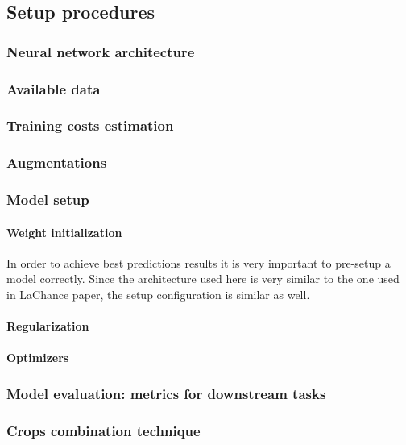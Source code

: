 \subsection{Setup procedures}
    \subsubsection{Neural network architecture}
        
    \subsubsection{Available data}
        
    \subsubsection{Training costs estimation}
        
    \subsubsection{Augmentations}
        \label{section:augmentations}
        
    \subsubsection{Model setup}
        \paragraph{Weight initialization}
            In order to achieve best predictions results it is very important to pre-setup a model correctly. Since the architecture used here is very similar to the one used in LaChance paper, the setup configuration is similar as well.  
            
        \paragraph{Regularization}
            \label{section:regularization}
            
        \paragraph{Optimizers}
            
    \subsubsection{Model evaluation: metrics for downstream tasks}
        \label{section:model-evaluation}
        
    \subsubsection{Crops combination technique}\label{par:crops-combination}
        